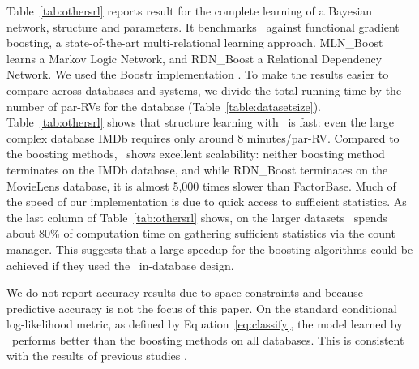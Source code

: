 Table~\ref{tab:othersrl} reports result for the complete learning of a Bayesian network, structure and parameters. It benchmarks \FB\ against functional gradient boosting, a state-of-the-art  multi-relational learning approach.
MLN\_Boost learns a Markov Logic Network, and RDN\_Boost a Relational Dependency Network. 
We used the Boostr implementation \cite{Khot2013}. 
To make the results easier to compare across databases and systems, we divide the total running time by the number of par-RVs for the database (Table~\ref{table:datasetsize}). 
Table~\ref{tab:othersrl} shows that structure learning with \FB\ is fast: even the large complex database IMDb requires only around 8 minutes/par-RV. Compared to the boosting methods, \FB\ shows excellent scalability: neither boosting method terminates on the IMDb database, and while RDN\_Boost terminates on the MovieLens database, it is almost 5,000 times slower than {\sc FactorBase}. 
Much of the speed of our implementation is due to quick access to sufficient statistics. As the last column of Table~\ref{tab:othersrl} shows, on the larger datasets \FB\ spends about 80\% of computation time on gathering sufficient statistics via the count manager. This suggests that a large  speedup for the boosting algorithms could be achieved if they used the \FB\ in-database design. 

We do not report accuracy results due to space constraints and because predictive accuracy is not the focus of this paper. On the standard conditional log-likelihood metric, as defined by Equation~\ref{eq:classify}, the model learned by \FB\ performs better than the boosting methods on all databases. This is consistent with the results of previous studies \cite{Schulte2012}.

\begin{table}[htbp] \caption{Learning Time Comparison (sec) with other statistical-relational learning systems. NT = non-termination}
  \centering
  \label{tab:othersrl}%
\end{table}%

